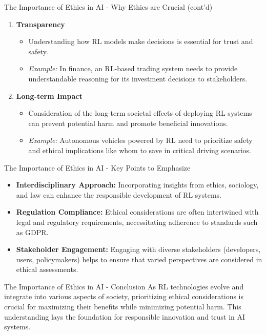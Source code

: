 \documentclass[aspectratio=169]{beamer}
\begin{document}
\begin{frame}[fragile]{The Importance of Ethics in AI - Why Ethics are Crucial (cont'd)}
    \begin{enumerate}[resume]
        \item \textbf{Transparency}
            \begin{itemize}
                \item Understanding how RL models make decisions is essential for trust and safety.
                \item \textit{Example:} In finance, an RL-based trading system needs to provide understandable reasoning for its investment decisions to stakeholders.
            \end{itemize}
        
        \item \textbf{Long-term Impact}
            \begin{itemize}
                \item Consideration of the long-term societal effects of deploying RL systems can prevent potential harm and promote beneficial innovations.
                \item \textit{Example:} Autonomous vehicles powered by RL need to prioritize safety and ethical implications like whom to save in critical driving scenarios.
            \end{itemize}
    \end{enumerate}
\end{frame}

\begin{frame}[fragile]{The Importance of Ethics in AI - Key Points to Emphasize}
    \begin{itemize}
        \item \textbf{Interdisciplinary Approach:} Incorporating insights from ethics, sociology, and law can enhance the responsible development of RL systems.
        \item \textbf{Regulation Compliance:} Ethical considerations are often intertwined with legal and regulatory requirements, necessitating adherence to standards such as GDPR.
        \item \textbf{Stakeholder Engagement:} Engaging with diverse stakeholders (developers, users, policymakers) helps to ensure that varied perspectives are considered in ethical assessments.
    \end{itemize}
\end{frame}

\begin{frame}[fragile]{The Importance of Ethics in AI - Conclusion}
    As RL technologies evolve and integrate into various aspects of society, prioritizing ethical considerations is crucial for maximizing their benefits while minimizing potential harm. This understanding lays the foundation for responsible innovation and trust in AI systems.
\end{frame}
\end{document}
